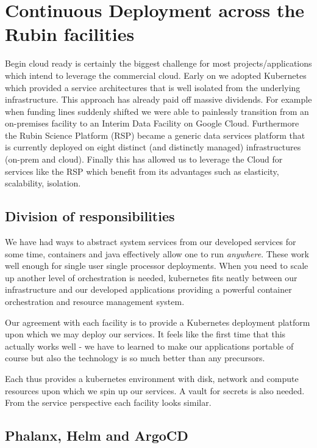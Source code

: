 \section{Continuous Deployment across the Rubin facilities} \label{sec:deploy}

Begin cloud ready is certainly the biggest challenge for most projects/applications which intend to leverage the commercial cloud.
Early on we adopted Kubernetes which provided a service architectures that is well isolated from the underlying infrastructure.
This approach has already paid off massive dividends.
For example when funding lines suddenly shifted we were able to painlessly transition from an on-premises facility to an Interim Data Facility on Google Cloud.
Furthermore the Rubin Science Platform (RSP) became a generic data services platform that is currently deployed on eight distinct (and distinctly managed) infrastructures (on-prem and cloud).
Finally this has allowed us to leverage the Cloud for services like the RSP which benefit from its advantages such as elasticity, scalability, isolation.




\subsection{Division of responsibilities}
We have had ways to abstract system services from our developed services for some time, containers and java effectively allow one to run \emph{anywhere}.
These work well enough for single user single processor deployments.
When you need to scale up another level of orchestration is needed, kubernetes fits neatly between our infrastructure and our developed applications providing a powerful container orchestration and resource management system.

Our agreement with each facility is to provide a Kubernetes deployment platform upon which we may deploy our services.
It feels like the first time that this actually works well - we have to learned to make our applications portable of course but also the technology is so much better than any precursors.

Each thus provides a kubernetes environment with disk, network and compute resources upon which we spin up our services.
A vault for secrets is also needed.
From the service perspective each facility looks similar.

\subsection{Phalanx, Helm and ArgoCD}

